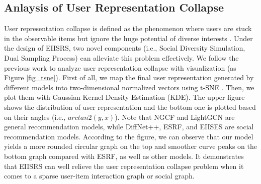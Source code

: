 \documentclass[letterpaper]{article} %
\begin{document}

\subsection{Anlaysis of User Representation Collapse}
User representation collapse is defined as the phenomenon where users are stuck in the observable items but ignore the huge potential of diverse interests \cite{collapse}. Under the design of EIISRS, two novel components (i.e., Social Diversity Simulation, Dual Sampling Process) can alleviate this problem effectively. We follow the previous work \cite{augmentation} to analyze user representation collapse with visualization (as Figure \ref{fig_tsne}). First of all, we map the final user representation generated by different models into two-dimensional normalized vectors using t-SNE \cite{TSNE}. Then, we plot them with Gaussian Kernel Density Estimation (KDE). The upper figure shows the distribution of user representation and the bottom one is plotted based on their angles (i.e., $arctan2(y,x)$). Note that NGCF and LightGCN are general recommendation models, while DiffNet++, ESRF, and EIISES are social recommendation models. According to the figure, we can observe that our model yields a more rounded circular graph on the top and smoother curve peaks on the bottom graph compared with ESRF, as well as other models. It demonstrates that EIISRS can well relieve the user representation collapse problem when it comes to a sparse user-item interaction graph or social graph.
\end{document}
